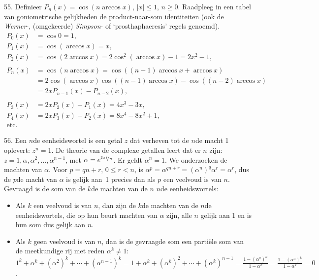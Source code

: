 \clearpage

\begin{problem}{55.}
	Definieer $P_n(x) = \cos (n \arccos x)$, $|x| \leqslant 1$, $n \geq 0$. Raadpleeg in een tabel van goniometrische gelijkheden de product-naar-som identi\-teiten (ook de \textit{Werner}-, (omgekeerde) \textit{Simpson}- of `prosthaphaeresis' regels genoemd).
    \begin{equation*}
    \begin{split}
        P_0(x) & = \cos 0 = 1, \\
        P_1(x) & = \cos (\arccos x) = x, \\
        P_2(x) & = \cos (2 \arccos x) = 2 \cos^2 (\arccos x) - 1 = 2 x^2 - 1, \\
        \\
        P_n(x) & = \cos (n \arccos x) = \cos ((n - 1) \arccos x + \arccos x) \\
               & = 2 \cos (\arccos x) \cos ((n - 1) \arccos x) - \cos ((n - 2) \arccos x) \\
               & = 2 x P_{n-1}(x) - P_{n-2}(x), \\
        \\
        P_3(x) & = 2 x P_2(x) - P_1(x) = 4 x^3 - 3 x, \\
        P_4(x) & = 2 x P_3(x) - P_2(x) = 8 x^4 - 8 x^2 + 1, \\
        \text{etc.}
    \end{split}
    \end{equation*}
\end{problem}

\begin{problem}{56.}
    Een $n$de eenheidswortel is een getal $z$ dat verheven tot de $n$de macht 1 oplevert: $z^n = 1$. De theorie van de complexe getallen leert dat er $n$ zijn: $z = 1,\alpha,\alpha^2,\dotsc,\alpha^{n-1}$, met $\alpha = e^{\nicefrac{2 \pi i}{n}}$. Er geldt $\alpha^n = 1$. We onderzoeken de machten van $\alpha$. Voor $p = q n + r$, $0 \leq r < n$, is $\alpha^p = \alpha^{q n + r} = {(\alpha^n)}^q \alpha^r = \alpha^r$, dus de $p$de macht van $\alpha$ is gelijk aan~1 precies dan als $p$ een veelvoud is van $n$. Gevraagd is de som van de $k$de machten van de $n$ $n$de eenheidswortels:
    \begin{itemize}
        \item Als $k$ een veelvoud is van $n$, dan zijn de $k$de machten van de $n$de eenheidswortels, die op hun beurt machten van $\alpha$ zijn, alle $n$ gelijk aan 1 en is hun som dus gelijk aan $n$.
        \item Als $k$ geen veelvoud is van $n$, dan is de gevraagde som een partiële som van de meetkundige rij met reden $\alpha^k \neq 1$: $1^k + \alpha^k + {(\alpha^2)}^k + \dotsb + {(\alpha^{n-1})}^k = 1 + \alpha^k + {(\alpha^k)}^2 + \dotsb + {(\alpha^k)}^{n-1} = \frac{1 - {(\alpha^k)}^n}{1 - \alpha^k} = \frac{1 - {(\alpha^n)}^k}{1 - \alpha^k} = 0$.
    \end{itemize}
\end{problem}

